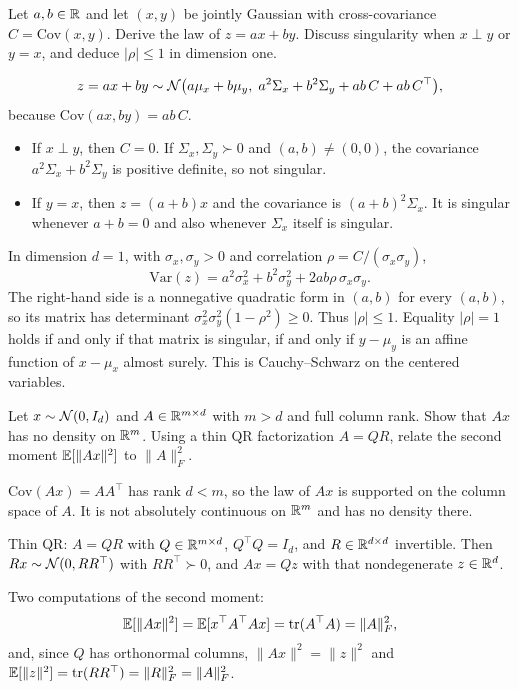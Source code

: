 \begin{hwqbox}
Let $a,b\in\mathbb{R}$ and let $(x,y)$ be jointly Gaussian with cross-covariance $C=\mathrm{Cov}(x,y)$. Derive the law of $z=ax+by$. Discuss singularity when $x\perp y$ or $y=x$, and deduce $|\rho|\le 1$ in dimension one.
\end{hwqbox}
\begin{hwsolbox}
\[
z=ax+by\sim\mathcal{N}\bigl(a\mu_x+b\mu_y,\; a^2\Sigma_x+b^2\Sigma_y+ab\,C+ab\,C^\top\bigr),
\]
because $\mathrm{Cov}(ax,by)=ab\,C$.
\begin{itemize}
\item If $x\perp y$, then $C=0$. If $\Sigma_x,\Sigma_y\succ 0$ and $(a,b)\ne(0,0)$, the covariance $a^2\Sigma_x+b^2\Sigma_y$ is positive definite, so not singular.
\item If $y=x$, then $z=(a+b)x$ and the covariance is $(a+b)^2\Sigma_x$. It is singular whenever $a+b=0$ and also whenever $\Sigma_x$ itself is singular.
\end{itemize}
In dimension $d=1$, with $\sigma_x,\sigma_y>0$ and correlation $\rho=C/(\sigma_x\sigma_y)$,
\[
\mathrm{Var}(z)=a^2\sigma_x^2+b^2\sigma_y^2+2ab\rho\,\sigma_x\sigma_y.
\]
The right-hand side is a nonnegative quadratic form in $(a,b)$ for every $(a,b)$, so its matrix has determinant $\sigma_x^2\sigma_y^2(1-\rho^2)\ge 0$. Thus $|\rho|\le 1$. Equality $|\rho|=1$ holds if and only if that matrix is singular, if and only if $y-\mu_y$ is an affine function of $x-\mu_x$ almost surely. This is Cauchy--Schwarz on the centered variables.
\end{hwsolbox}

\begin{hwqbox}
Let $x\sim\mathcal{N}(0,I_d)$ and $A\in\mathbb{R}^{m\times d}$ with $m>d$ and full column rank. Show that $Ax$ has no density on $\mathbb{R}^m$. Using a thin QR factorization $A=QR$, relate the second moment $\mathbb{E}[\lVert Ax\rVert^2]$ to $\lVert A\rVert_F^2$.
\end{hwqbox}
\begin{hwsolbox}
$\mathrm{Cov}(Ax)=AA^\top$ has rank $d<m$, so the law of $Ax$ is supported on the column space of $A$. It is not absolutely continuous on $\mathbb{R}^m$ and has no density there.

Thin QR: $A=QR$ with $Q\in\mathbb{R}^{m\times d}$, $Q^\top Q=I_d$, and $R\in\mathbb{R}^{d\times d}$ invertible. Then $Rx\sim\mathcal{N}(0,RR^\top)$ with $RR^\top\succ 0$, and $Ax=Qz$ with that nondegenerate $z\in\mathbb{R}^d$.

Two computations of the second moment:
\[
\mathbb{E}[\lVert Ax\rVert^2]=\mathbb{E}[x^\top A^\top Ax]=\operatorname{tr}(A^\top A)=\lVert A\rVert_F^2,
\]
and, since $Q$ has orthonormal columns, $\lVert Ax\rVert^2=\lVert z\rVert^2$ and $\mathbb{E}[\lVert z\rVert^2]=\operatorname{tr}(RR^\top)=\lVert R\rVert_F^2=\lVert A\rVert_F^2$.
\end{hwsolbox}

